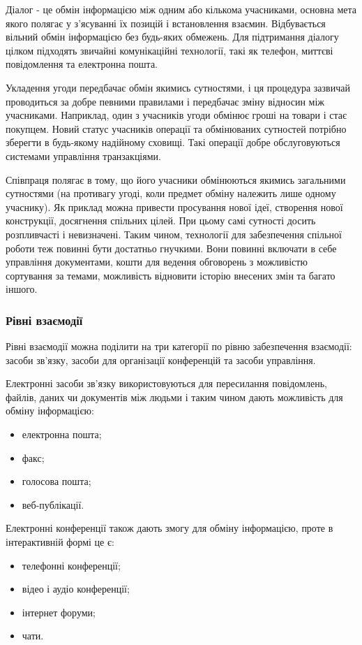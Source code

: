 \par Діалог - це обмін інформацією між одним або кількома учасниками, основна мета якого полягає у з'ясуванні їх позицій і встановлення взаємин. 
Відбувається вільний обмін інформацією без будь-яких обмежень. 
Для підтримання діалогу цілком підходять звичайні комунікаційні технології, такі як телефон, миттєві повідомлення та електронна пошта.
\par Укладення угоди передбачає обмін якимись сутностями, і ця процедура зазвичай проводиться за добре певними правилами і передбачає зміну відносин між учасниками. Наприклад, один з учасників угоди обмінює гроші на товари і стає покупцем. Новий статус учасників операції та обмінюваних сутностей потрібно зберегти в будь-якому надійному сховищі. Такі операції добре обслуговуються системами управління транзакціями. 
\par Співпраця полягає в тому, що його учасники обмінюються якимись загальними сутностями (на противагу угоді, коли предмет обміну належить лише одному учаснику). 
Як приклад можна привести просування нової ідеї, створення нової конструкції, досягнення спільних цілей. 
При цьому самі сутності досить розпливчасті і невизначені. 
Таким чином, технології для забезпечення спільної роботи теж повинні бути достатньо гнучкими. 
Вони повинні включати в себе управління документами, кошти для ведення обговорень з можливістю сортування за темами, можливість відновити історію внесених змін та багато іншого.
 
\subsubsection{Рівні взаємодії}

Рівні взаємодії можна поділити на три категорії по рівню забезпечення взаємодії: засоби зв'язку, засоби для організації конференцій та засоби управління.

\par Електронні засоби зв'язку використовуються для пересилання повідомлень, файлів, даних чи документів між людьми і таким чином дають можливість для обміну інформацією:
\begin{itemize}
\item електронна пошта;
\item факс;
\item голосова пошта;
\item веб-публікації.
\end{itemize}

Електронні конференції також дають змогу для обміну інформацією, проте в інтерактивній формі це є:
\begin{itemize}
\item телефонні конференції;
\item відео і аудіо конференції;
\item інтернет форуми;
\item чати.
\end{itemize}

